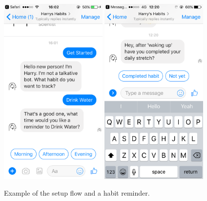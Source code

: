 \begin{figure}[H]
  \centering
  \includegraphics[width=2.1in]{../resources/design/media/5.png}
  \hspace{10px}
  \includegraphics[width=2.1in]{../resources/design/media/3.png}
  \caption{Example of the setup flow and a habit reminder.}
  \label{fig:setup_media_2}
\end{figure}

\newpage
